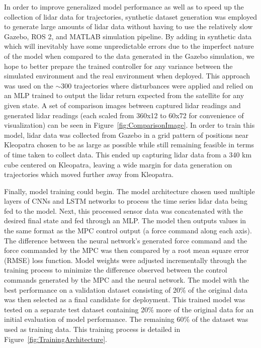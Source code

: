 \documentclass[twocolumn,letterpaper]{IEEEAerospaceCLS}
\begin{document}
In order to improve generalized model performance as well as to speed up the collection of lidar data for trajectories, synthetic dataset generation was employed to generate large amounts of lidar data without having to use the relatively slow Gazebo, ROS 2, and MATLAB simulation pipeline. By adding in synthetic data which will inevitably have some unpredictable errors due to the imperfect nature of the model when compared to the data generated in the Gazebo simulation, we hope to better prepare the trained controller for any variance between the simulated environment and the real environment when deployed. This approach was used on the $\sim$300 trajectories where disturbances were applied and relied on an MLP trained to output the lidar return expected from the satellite for any given state.  A set of comparison images between captured lidar readings and generated lidar readings (each scaled from 360x12 to 60x72 for convenience of visualization) can be seen in Figure~\ref{fig:ComparisonImage}. In order to train this model, lidar data was collected from Gazebo in a grid pattern of positions near Kleopatra chosen to be as large as possible while still remaining feasible in terms of time taken to collect data. This ended up capturing lidar data from a 340 km cube centered on Kleopatra, leaving a wide margin for data generation on trajectories which moved further away from Kleopatra.



Finally, model training could begin. The model architecture chosen used multiple layers of CNNs and LSTM networks to process the time series lidar data being fed to the model. Next, this processed sensor data was concatenated with the desired final state and fed through an MLP\cite{Kaufmann2020-mr}. The model then outputs values in the same format as the MPC control output (a force command along each axis). The difference between the neural network's generated force command and the force commanded by the MPC was then compared by a root mean square error (RMSE) loss function. Model weights were adjusted incrementally through the training process to minimize the difference observed between the control commands generated by the MPC and the neural network. The model with the best performance on a validation dataset consisting of 20\% of the original data was then selected as a final candidate for deployment. This trained model was tested on a separate test dataset containing 20\% more of the original data for an initial evaluation of model performance. The remaining 60\% of the dataset was used as training data. This training process is detailed in Figure~\ref{fig:TrainingArchitecture}. 
\end{document}
